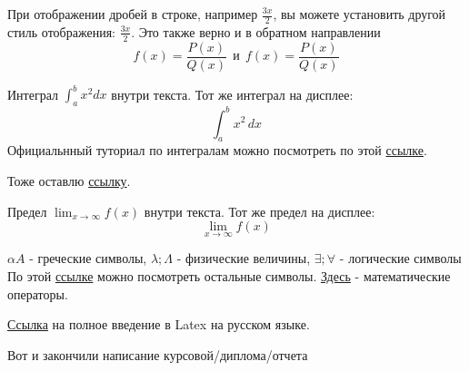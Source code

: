     При отображении дробей в строке, например \(\frac{3x}{2}\),
    вы можете установить другой стиль отображения:
    \( \displaystyle \frac{3x}{2} \).
    Это также верно и в обратном направлении
    \[ f(x)=\frac{P(x)}{Q(x)} \ \ \textrm{и}
    \ \ f(x)=\textstyle\frac{P(x)}{Q(x)} \]

    Интеграл \(\int_{a}^{b} x^2 dx\) внутри текста.
    \medskip
    Тот же интеграл на дисплее:
    \[
    \int_{a}^{b} x^2 \,dx
    \]
    Официальнный туториал по интегралам можно посмотреть по этой  \href{https://www.overleaf.com/learn/latex/Integrals,_sums_and_limits#Integrals}{ссылке}.

    Тоже оставлю \href{https://www.overleaf.com/learn/latex/Integrals,_sums_and_limits#Sums_and_products}{ссылку}.


    Предел \(\lim_{x\to\infty} f(x)\) внутри текста.
    Тот же предел на дисплее:
    \[
    \lim_{x\to\infty} f(x)
    \]

$\alpha A$ - греческие символы,  $ \lambda; \Lambda$ - физические величины, $\exists; \forall$ - логические символы\\
По этой   \href{https://www.overleaf.com/learn/latex/List_of_Greek_letters_and_math_symbols}{ссылке} можно посмотреть остальные символы. \href{https://www.overleaf.com/learn/latex/Operators}{Здесь} - математические операторы.



\href{https://www.texlive.info/CTAN/info/lshort/russian/lshortru.pdf}{Ссылка} на полное введение в Latex на русском языке.


\newpage
{}
Вот и закончили написание курсовой/диплома/отчета



\newpage

